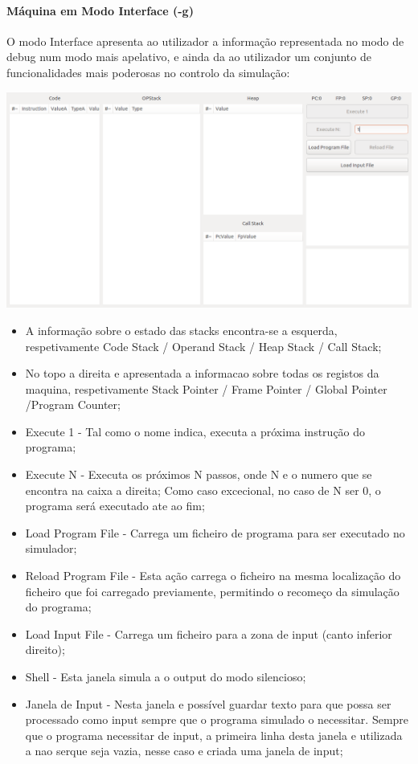 \documentclass{report}
\begin{document}
\paragraph{\quad Máquina em Modo Interface (-g)}
  O modo Interface apresenta ao utilizador a informação representada no modo de debug num modo mais apelativo,
	e ainda da ao utilizador um conjunto de funcionalidades mais poderosas no controlo da simulação:

	\begin{center}
	\includegraphics[width=15cm]{gtk2.png}
	\end{center}

	\begin{itemize}
		\item A informação sobre o estado das stacks encontra-se a esquerda, respetivamente
		 Code Stack / Operand Stack / Heap Stack /	Call Stack;
		\item No topo a direita e apresentada a informacao sobre todas os registos da maquina, respetivamente
			Stack Pointer / Frame Pointer /	Global Pointer /Program Counter;
		\item Execute 1 - Tal como o nome indica, executa a próxima instrução do programa;
		\item Execute N - Executa os próximos N passos, onde N e o numero que se encontra na caixa a direita; Como caso excecional,
		no caso de N ser 0, o programa será executado ate ao fim;
		\item Load Program File - Carrega um ficheiro de programa para ser executado no simulador;
		\item Reload Program File - Esta ação carrega o ficheiro na	mesma localização do ficheiro que foi carregado previamente,
		permitindo o recomeço da simulação do programa;
		\item Load Input File - Carrega um ficheiro para a zona de input (canto inferior direito);
		\item Shell - Esta janela simula a o output do modo silencioso;
		\item Janela de Input - Nesta janela e possível guardar texto para que possa ser processado como input sempre que
		o programa simulado o necessitar. Sempre que o programa necessitar de input, a primeira linha desta janela e utilizada
		a nao serque seja vazia, nesse caso e criada uma janela de input;
	\end{itemize}
\end{document}
